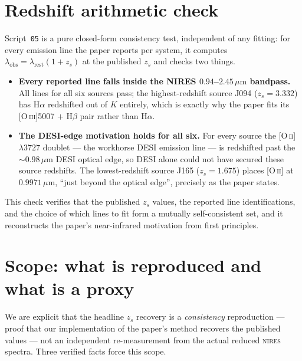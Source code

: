 \documentclass[11pt,letterpaper]{article}
\newcommand{\zs}{\ensuremath{z_s}}
\newcommand{\micron}{\ensuremath{\,\mu\mathrm{m}}}
\newcommand{\NIRES}{\textsc{nires}}
\begin{document}
\section{Redshift arithmetic check}

Script~\texttt{05} is a pure closed-form consistency test, independent of
any fitting: for every emission line the paper reports per system, it
computes $\lambda_{\mathrm{obs}} = \lambda_{\mathrm{rest}}(1+\zs)$ at the
published \zs{} and checks two things.

\begin{itemize}
\item \textbf{Every reported line falls inside the NIRES
      $0.94$--$2.45\micron$ bandpass.} All lines for all six sources pass;
      the highest-redshift source J094 ($\zs = 3.332$) has H$\alpha$
      redshifted out of $K$ entirely, which is exactly why the paper fits
      its [O\,\textsc{iii}]5007 $+$ H$\beta$ pair rather than H$\alpha$.
\item \textbf{The DESI-edge motivation holds for all six.} For every
      source the [O\,\textsc{ii}]\,$\lambda3727$ doublet --- the workhorse
      DESI emission line --- is redshifted past the ${\sim}0.98\micron$
      DESI optical edge, so DESI alone could not have secured these source
      redshifts. The lowest-redshift source J165 ($\zs = 1.675$) places
      [O\,\textsc{ii}] at $0.9971\micron$, ``just beyond the optical
      edge'', precisely as the paper states.
\end{itemize}

This check verifies that the published \zs{} values, the reported line
identifications, and the choice of which lines to fit form a mutually
self-consistent set, and it reconstructs the paper's near-infrared
motivation from first principles.

\section{Scope: what is reproduced and what is a proxy}
\label{sec:scope}

We are explicit that the headline \zs{} recovery is a \emph{consistency}
reproduction --- proof that our implementation of the paper's method
recovers the published values --- not an independent re-measurement from
the actual reduced \NIRES{} spectra. Three verified facts force this
scope.
\end{document}
